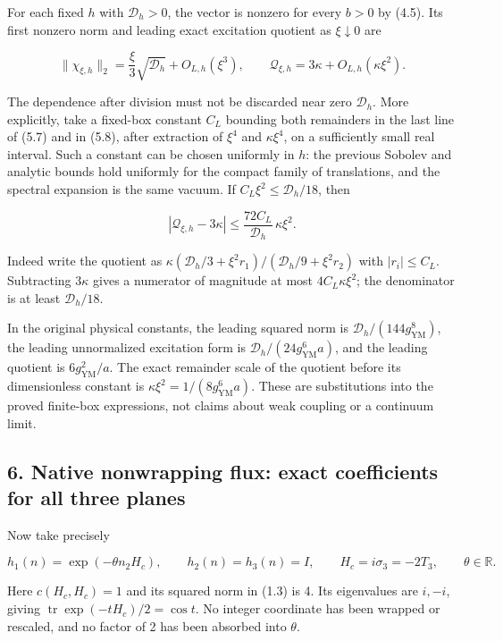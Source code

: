 \documentclass[
  11pt,
]{article}
\begin{document}
For each fixed \(h\) with \(\mathcal D_h>0\), the vector is nonzero for
every \(b>0\) by (4.5). Its first nonzero norm and leading exact
excitation quotient as \(\xi\downarrow0\) are

\[
\boxed{
\|\chi_{\xi,h}\|_2=\frac{\xi}{3}\sqrt{\mathcal D_h}+O_{L,h}(\xi^3),
\qquad \mathcal Q_{\xi,h}=3\kappa+O_{L,h}(\kappa\xi^2).}
\tag{5.9}
\]

The dependence after division must not be discarded near zero
\(\mathcal D_h\). More explicitly, take a fixed-box constant \(C_L\)
bounding both remainders in the last line of (5.7) and in (5.8), after
extraction of \(\xi^4\) and \(\kappa\xi^4\), on a sufficiently small
real interval. Such a constant can be chosen uniformly in \(h\): the
previous Sobolev and analytic bounds hold uniformly for the compact
family of translations, and the spectral expansion is the same vacuum.
If \(C_L\xi^2\le\mathcal D_h/18\), then

\[
|\mathcal Q_{\xi,h}-3\kappa|
\le\frac{72C_L}{\mathcal D_h}\,\kappa\xi^2.
\tag{5.10}
\]

Indeed write the quotient as
\(\kappa(\mathcal D_h/3+\xi^2r_1)/(\mathcal D_h/9+\xi^2r_2)\) with
\(|r_i|\le C_L\). Subtracting \(3\kappa\) gives a numerator of magnitude
at most \(4C_L\kappa\xi^2\); the denominator is at least
\(\mathcal D_h/18\).

In the original physical constants, the leading squared norm is
\(\mathcal D_h/(144g_{\mathrm{YM}}^8)\), the leading unnormalized
excitation form is \(\mathcal D_h/(24g_{\mathrm{YM}}^6a)\), and the
leading quotient is \(6g_{\mathrm{YM}}^2/a\). The exact remainder scale
of the quotient before its dimensionless constant is
\(\kappa\xi^2=1/(8g_{\mathrm{YM}}^6a)\). These are substitutions into
the proved finite-box expressions, not claims about weak coupling or a
continuum limit.

\subsection{6. Native nonwrapping flux: exact coefficients for all three
planes}\label{magnetic-part-2-native-nonwrapping-flux-exact-coefficients-for-all-three-planes}

Now take precisely

\[
h_1(n)=\exp(-\theta n_2H_c),\qquad h_2(n)=h_3(n)=I,\qquad
H_c=i\sigma_3=-2T_3,\qquad \theta\in\mathbb R.
\tag{6.1}
\]

Here \(c(H_c,H_c)=1\) and its squared norm in (1.3) is 4. Its
eigenvalues are \(i,-i\), giving
\(\operatorname{tr}\exp(-tH_c)/2=\cos t\). No integer coordinate has
been wrapped or rescaled, and no factor of 2 has been absorbed into
\(\theta\).
\end{document}
